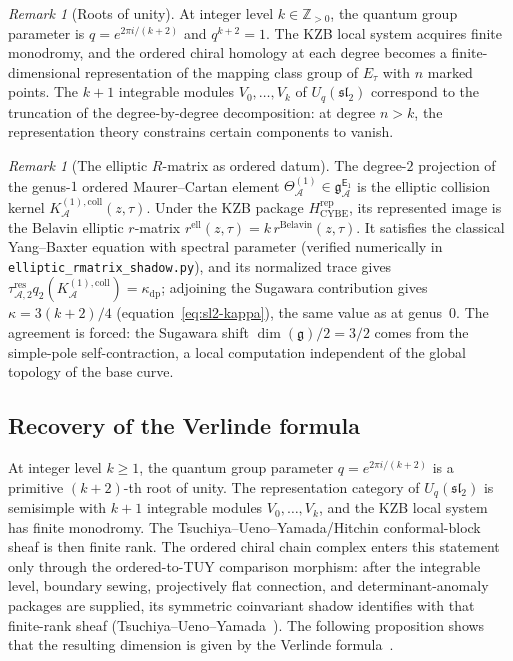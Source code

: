 \documentclass[11pt,reqno]{amsart}
\theoremstyle{definition}
\theoremstyle{remark}
\newtheorem{remark}[theorem]{Remark}
\newcommand{\cA}{\mathcal{A}}
\newcommand{\Eone}{\mathsf{E}_{1}}
\newcommand{\fg}{\mathfrak{g}}
\newcommand{\gEone}{\mathfrak{g}^{\Eone}_{\cA}}
\newcommand{\ZZ}{\mathbb{Z}}
\numberwithin{equation}{section}
\begin{document}
\begin{remark}[Roots of unity]
\label{rem:ell-roots-of-unity}
At integer level $k \in \ZZ_{>0}$, the quantum group
parameter is $q = e^{2\pi i/(k+2)}$ and
$q^{k+2} = 1$. The KZB local system acquires finite
monodromy, and the ordered chiral homology at each degree
becomes a finite-dimensional representation of the mapping
class group of $E_\tau$ with $n$ marked points. The
$k + 1$ integrable modules $V_0, \ldots, V_k$ of
$U_q(\mathfrak{sl}_2)$ correspond to the truncation of the
degree-by-degree decomposition: at degree $n > k$, the
representation theory constrains certain components to
vanish.
\end{remark}

\begin{remark}[The elliptic $R$-matrix as ordered datum]
\label{rem:ell-r-matrix-ordered}
The degree-$2$ projection of the genus-$1$ ordered Maurer--Cartan
element $\Theta_\cA^{(1)}\in\gEone$ is the elliptic collision kernel
$K_\cA^{(1),\mathrm{coll}}(z,\tau)$. Under the KZB package
$H_{\mathrm{CYBE}}^{\mathrm{rep}}$, its represented image is the
Belavin elliptic $r$-matrix
$r^{\mathrm{ell}}(z,\tau)=k\,r^{\mathrm{Belavin}}(z,\tau)$.
It satisfies the classical Yang--Baxter equation with spectral parameter (verified
numerically in \texttt{elliptic\_rmatrix\_shadow.py}),
and its normalized trace gives
$\tau_{\cA,2}^{\mathrm{res}}q_2(K_\cA^{(1),\mathrm{coll}})
=\kappa_{\mathrm{dp}}$; adjoining the Sugawara contribution gives
$\kappa=3(k+2)/4$
(equation~\eqref{eq:sl2-kappa}), the same value as at
genus~$0$. The agreement is forced: the Sugawara shift
$\dim(\fg)/2 = 3/2$ comes from the simple-pole
self-contraction, a local computation independent of the
global topology of the base curve.
\end{remark}


\subsection{Recovery of the Verlinde formula}
\label{subsec:verlinde-recovery}

At integer level $k \geq 1$, the quantum group parameter
$q = e^{2\pi i/(k+2)}$ is a primitive $(k+2)$-th root of unity.
The representation category of $U_q(\mathfrak{sl}_2)$ is
semisimple with $k+1$ integrable modules $V_0, \ldots, V_k$,
and the KZB local system has finite monodromy.
The Tsuchiya--Ueno--Yamada/Hitchin conformal-block sheaf is
then finite rank.  The ordered chiral chain complex enters this
statement only through the ordered-to-TUY comparison morphism:
after the integrable level, boundary sewing, projectively flat
connection, and determinant-anomaly packages are supplied, its
symmetric coinvariant shadow identifies with that finite-rank
sheaf (Tsuchiya--Ueno--Yamada~\cite{TUY89}).
The following proposition shows that the resulting dimension
is given by the Verlinde formula~\cite{Verlinde88}.
\end{document}
